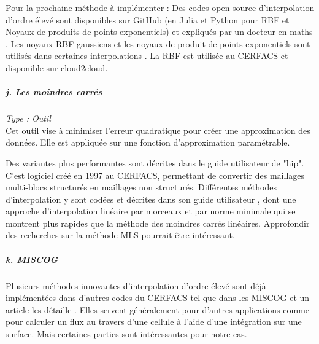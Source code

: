 Pour la prochaine méthode à implémenter : Des codes open source d'interpolation d'ordre élevé sont disponibles sur GitHub (en Julia \cite{opensource} et Python \cite{opensource_2} pour RBF et Noyaux de produits de points exponentiels) et expliqués par un docteur en maths \cite{Rosenfeld}. Les noyaux RBF gaussiens et les noyaux de produit de points exponentiels sont utilisés dans certaines interpolations \cite{opensource_2}. La RBF est utilisée au CERFACS et disponible sur cloud2cloud.

\subparagraph{j. Les moindres carrés} %
\textit{Type : Outil} \\ %
\phantom{----}
Cet outil vise à minimiser l'erreur quadratique pour créer une approximation des données. Elle est appliquée sur une fonction d'approximation paramétrable.

Des variantes plus performantes sont décrites dans le guide utilisateur de "hip".
C'est logiciel créé en 1997 au CERFACS, permettant de convertir des maillages multi-blocs structurés en maillages non structurés.
Différentes méthodes d'interpolation y sont codées et décrites dans son guide utilisateur \cite{muller2020}, dont une approche d'interpolation linéaire par morceaux et par norme minimale qui se montrent plus rapides que la méthode des moindres carrés linéaires.
Approfondir des recherches sur la méthode \ac{MLS} \cite{MLS, levin} pourrait être intéressant.

\subparagraph{k. MISCOG}

\phantom{----}

Plusieurs méthodes innovantes d'interpolation d'ordre élevé sont déjà implémentées dans d'autres codes du CERFACS tel que dans les \ac{MISCOG} et un article les détaille \cite{laborderie2018}. Elles servent généralement pour d'autres applications comme pour calculer un flux au travers d'une cellule \cite{alexis} à l'aide d'une intégration sur une surface. Mais certaines parties sont intéressantes pour notre cas.


\vspace{1,5cm}


